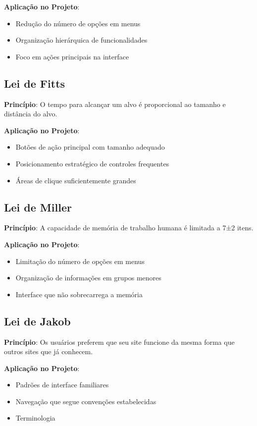 \textbf{Aplicação no Projeto}:
\begin{itemize}
    \item Redução do número de opções em menus
    \item Organização hierárquica de funcionalidades
    \item Foco em ações principais na interface
\end{itemize}

\subsection{Lei de Fitts}

\textbf{Princípio}: O tempo para alcançar um alvo é proporcional ao tamanho e distância do alvo.

\textbf{Aplicação no Projeto}:
\begin{itemize}
    \item Botões de ação principal com tamanho adequado
    \item Posicionamento estratégico de controles frequentes
    \item Áreas de clique suficientemente grandes
\end{itemize}

\subsection{Lei de Miller}

\textbf{Princípio}: A capacidade de memória de trabalho humana é limitada a 7±2 itens.

\textbf{Aplicação no Projeto}:
\begin{itemize}
    \item Limitação do número de opções em menus
    \item Organização de informações em grupos menores
    \item Interface que não sobrecarrega a memória
\end{itemize}

\subsection{Lei de Jakob}

\textbf{Princípio}: Os usuários preferem que seu site funcione da mesma forma que outros sites que já conhecem.

\textbf{Aplicação no Projeto}:
\begin{itemize}
    \item Padrões de interface familiares
    \item Navegação que segue convenções estabelecidas
    \item Terminologia
\end{itemize}

